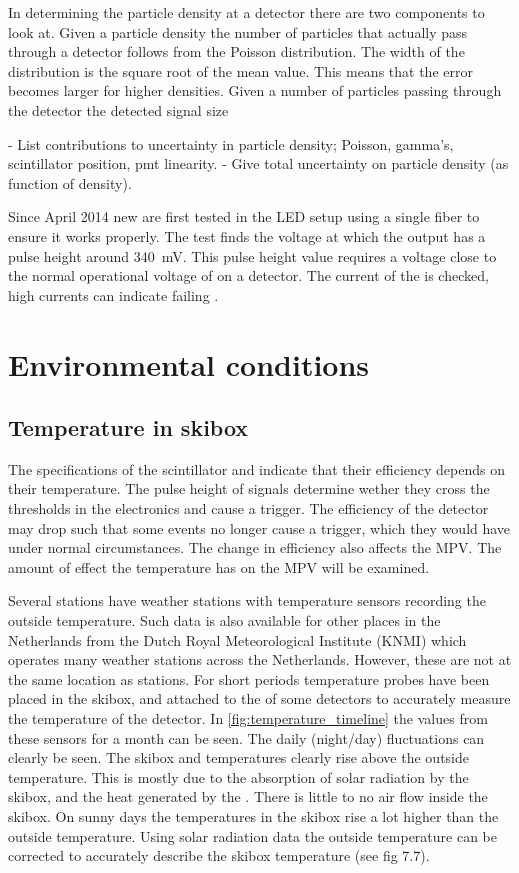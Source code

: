 In determining the particle density at a detector there are two components to look at. Given a particle density the number of particles that actually pass through a detector follows from the Poisson distribution. The width of the distribution is the square root of the mean value. This means that the error becomes larger for higher densities. Given a number of particles passing through the detector the detected signal size

- List contributions to uncertainty in particle density; Poisson, gamma's, scintillator position, pmt linearity.
- Give total uncertainty on particle density (as function of density).

Since April 2014 new \pmts are first tested in the LED setup using a single fiber to ensure it works properly. The test finds the voltage at which the output has a pulse height around \SI{340}{\milli\volt}. This pulse height value requires a voltage close to the normal operational voltage of \pmts on a \hisparc detector. The current of the \pmt is checked, high currents can indicate failing \pmts.


\section{Environmental conditions}
\label{sec:detector-environmental}

\subsection{Temperature in skibox}

The specifications of the scintillator and \pmt indicate that their efficiency depends on their temperature. The pulse height of signals determine wether they cross the thresholds in the electronics and cause a trigger. The efficiency of the detector may drop such that some events no longer cause a trigger, which they would have under normal circumstances. The change in efficiency also affects the MPV. The amount of effect the temperature has on the MPV will be examined.

Several \hisparc stations have weather stations with temperature sensors recording the outside temperature. Such data is also available for other places in the Netherlands from the Dutch Royal Meteorological Institute (KNMI) which operates many weather stations across the Netherlands. However, these are not at the same location as \hisparc stations. For short periods temperature probes have been placed in the skibox, and attached to the \pmt of some detectors to accurately measure the temperature of the detector. In \cref{fig:temperature_timeline} the values from these sensors for a month can be seen. The daily (night/day) fluctuations can clearly be seen. The skibox and \pmt temperatures clearly rise above the outside temperature. This is mostly due to the absorption of solar radiation by the skibox, and the heat generated by the \pmt. There is little to no air flow inside the skibox. On sunny days the temperatures in the skibox rise a lot higher than the outside temperature. Using solar radiation data the outside temperature can be corrected to accurately describe the skibox temperature (see \cite{devries2012weather} fig 7.7).

